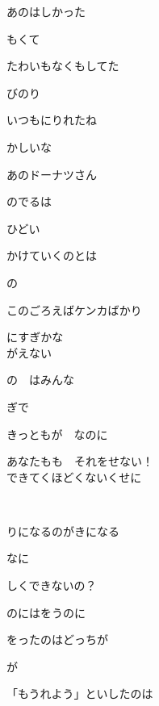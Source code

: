 \large{

あのはしかった　

もくて

たわいもなくもしてた

びのり　

いつもにりれたね

かしいな　

あのドーナツさん

のでるは　

ひどい

かけていくのとは　

の

このごろえばケンカばかり

にすぎかな
\\

がえない　

の　はみんな　

ぎで

きっともが　なのに　

あなたもも　それをせない！
\\

できてくほどくないくせに


りになるのがきになる

なに　

しくできないの？

のにはをうのに

をったのはどっちが　

が

「もうれよう」といしたのは　

}
